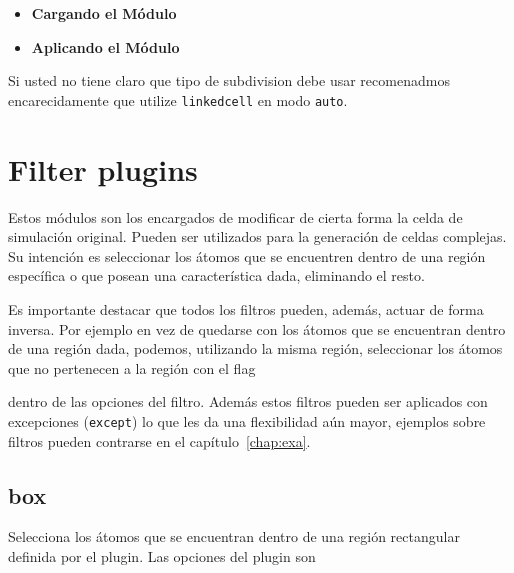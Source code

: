 \begin{itemize}
 \item \textbf{Cargando el M\'odulo}
 \item \textbf{Aplicando el M\'odulo}
\end{itemize}

Si usted no tiene claro que tipo de subdivision debe usar recomenadmos
encarecidamente que utilize \verb|linkedcell| en modo \verb|auto|.
\section{Filter plugins}
Estos m\'odulos son los encargados de modificar de cierta forma la celda de
simulaci\'on original. Pueden ser utilizados para la generaci\'on de celdas
complejas. Su intenci\'on es seleccionar los \'atomos que se encuentren dentro
de una regi\'on espec\'ifica o que posean una caracter\'istica dada, eliminando
el resto.

Es importante destacar que todos los filtros pueden, adem\'as, actuar de forma
inversa. Por ejemplo en vez de quedarse con los \'atomos que se encuentran
dentro de una regi\'on dada, podemos, utilizando la misma regi\'on, seleccionar
los \'atomos que no pertenecen a la regi\'on con el flag


dentro de las opciones del filtro. Adem\'as estos filtros pueden ser aplicados
con excepciones (\verb|except|) lo que les da una flexibilidad a\'un mayor,
ejemplos sobre filtros pueden contrarse en el cap\'itulo~\ref{chap:exa}.

\subsection{box}
Selecciona los \'atomos que se encuentran dentro de una regi\'on rectangular
definida por el plugin. Las opciones del plugin son


